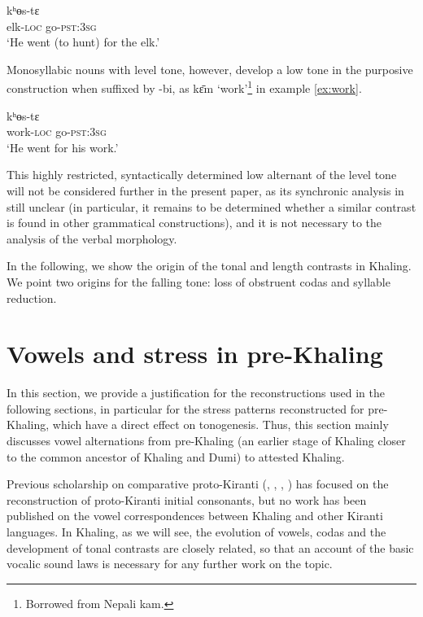 \documentclass[oldfontcommands,oneside,a4paper,11pt]{article}
\newcommand{\ipa}[1]{{\phon \mbox{#1}}} %
\begin{document}
\begin{exe}
\ex \label{ex:elk}
\gll   \ipa{kɛ̂m-bi} \ipa{kʰɵs-tɛ}  \\
elk-\textsc{loc} go-\textsc{pst:3sg} \\
\glt `He went (to hunt) for the elk.'
\end{exe}


Monosyllabic nouns with level tone, however, develop a low tone in the purposive construction when suffixed by \ipa{-bi}, as \ipa{kɛ̄m}  `work'\footnote{Borrowed from Nepali \ipa{kam}.} in example \ref{ex:work}.
\begin{exe}
\ex \label{ex:work}
\gll   \ipa{kɛ̀m-bi} \ipa{kʰɵs-tɛ}  \\
work-\textsc{loc} go-\textsc{pst:3sg} \\
\glt `He went for his work.'
\end{exe}


This highly restricted, syntactically determined low alternant of the level tone will not be considered further in the present paper, as its synchronic analysis in still unclear (in particular, it remains to be determined whether a similar contrast is found in other grammatical constructions), and it is not necessary to the analysis of the verbal morphology.


In the following, we show the origin of the tonal and length contrasts in Khaling. We point  two origins for the falling tone: loss of obstruent codas and syllable reduction.

\section{Vowels and stress in pre-Khaling}
 In this section, we provide a justification for the reconstructions used in the following sections,   in particular   for the stress patterns reconstructed for pre-Khaling, which have a direct effect on tonogenesis. Thus, this section mainly discusses vowel alternations from pre-Khaling (an earlier stage of Khaling closer to the common ancestor of Khaling and Dumi) to attested Khaling.

Previous scholarship on comparative proto-Kiranti (\citealt{driem90r}, \citealt{michailovsky94stops}, \citealt{starostin94kiranti}, \citealt{opgenort05jero}) has focused on the reconstruction of proto-Kiranti initial consonants, but no work has been published on the vowel correspondences between Khaling and other Kiranti languages. In Khaling, as we will see, the evolution of vowels, codas and the development of tonal contrasts are closely related, so that an account of the basic vocalic sound laws is necessary for any further work on the topic.
\end{document}
